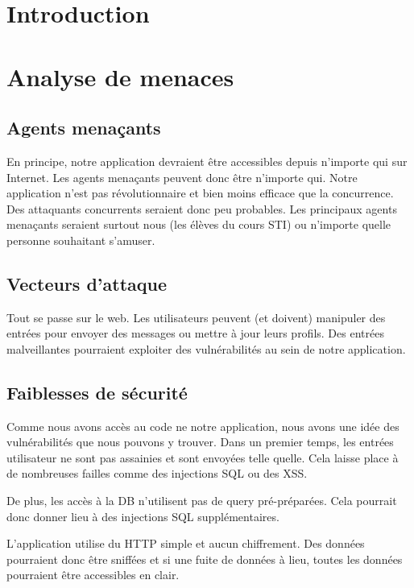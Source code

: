 \documentclass[12pt]{article}
\begin{document}


\tableofcontents

\newpage
\section{Introduction}

\section{Analyse de menaces}
\subsection{Agents menaçants}
En principe, notre application devraient être accessibles depuis n'importe qui sur Internet. Les agents menaçants peuvent donc être n'importe qui. Notre application n'est pas révolutionnaire et bien moins efficace que la concurrence. Des attaquants concurrents seraient donc peu probables. Les principaux agents menaçants seraient surtout nous (les élèves du cours STI) ou n'importe quelle personne souhaitant s'amuser.

\subsection{Vecteurs d'attaque}
Tout se passe sur le web. Les utilisateurs peuvent (et doivent) manipuler des entrées pour envoyer des messages ou mettre à jour leurs profils. Des entrées malveillantes pourraient exploiter des vulnérabilités au sein de notre application.

\subsection{Faiblesses de sécurité}
Comme nous avons accès au code ne notre application, nous avons une idée des vulnérabilités que nous pouvons y trouver. Dans un premier temps, les entrées utilisateur ne sont pas assainies et sont envoyées telle quelle. Cela laisse place à de nombreuses failles comme des injections SQL ou des XSS.

De plus, les accès à la DB n'utilisent pas de query pré-préparées. Cela pourrait donc donner lieu à des injections SQL supplémentaires.

L'application utilise du HTTP simple et aucun chiffrement. Des données pourraient donc être sniffées et si une fuite de données à lieu, toutes les données pourraient être accessibles en clair.
\end{document}
